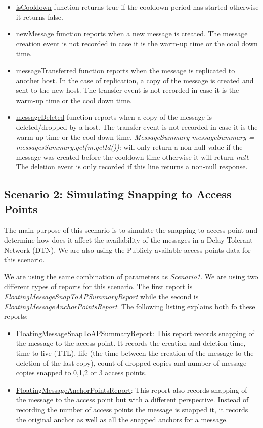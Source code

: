 \begin{itemize}
	\item \underline{isCooldown} function returns true if the cooldown period has started otherwise it returns false.
	\item \underline{newMessage} function reports when a new message is created. The message creation event is not recorded in case it is the warm-up time or the cool down time.
	\item \underline{messageTransferred} function reports when the message is replicated to another host. In the case of replication, a copy of the message is created and sent to the new host. The transfer event is not recorded in case it is the warm-up time or the cool down time.
	\item \underline{messageDeleted} function reports when a copy of the message is deleted/dropped by a host. The transfer event is not recorded in case it is the warm-up time or the cool down time. \newline \textit{MessageSummary messageSummary = messagesSummary.get(m.getId());} will only return a non-null value if the message was created before the cooldown time otherwise it will return \textit{null}. The deletion event is only recorded if this line returns a non-null response.
\end{itemize}

\subsection{Scenario 2: Simulating Snapping to Access Points}
The main purpose of this scenario is to simulate the snapping to access point and determine how does it affect the availability of the messages in a Delay Tolerant Network (DTN). We are also using the Publicly available access points data for this scenario.

We are using the same combination of parameters as \textit{Scenario1}. \newline
We are using two different types of reports for this scenario. The first report is \textit{FloatingMessageSnapToAPSummaryReport} while the second is \textit{FloatingMessageAnchorPointsReport}. The following listing explains both fo these reports:

\begin{itemize}
	\item \underline{FloatingMessageSnapToAPSummaryReport}: This report records snapping of the message to the access point. It records the creation and deletion time, time to live (TTL), life (the time between the creation of the message to the deletion of the last copy), count of dropped copies and number of message copies snapped to 0,1,2 or 3 access points.
	\item \underline{FloatingMessageAnchorPointsReport}: This report also records snapping of the message to the access point but with a different perspective. Instead of recording the number of access points the message is snapped it, it records the original anchor as well as all the snapped anchors for a message.
\end{itemize}

